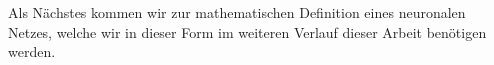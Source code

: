 Als Nächstes kommen wir zur mathematischen Definition eines neuronalen Netzes, welche wir in dieser Form im weiteren Verlauf dieser Arbeit benötigen werden.

